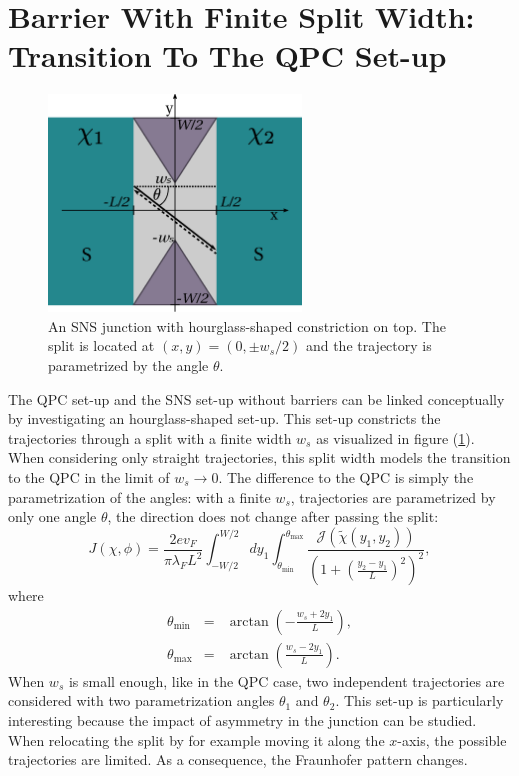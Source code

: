\section{Barrier With Finite Split Width: Transition To The QPC Set-up}
\begin{figure}
\centering
\includegraphics[width=0.6\textwidth]{figure/analyticalmodel/hourglass_csch}
\caption{An SNS junction with hourglass-shaped constriction on top. The split is located at $(x, y) = (0, \pm w_s / 2)$ and  the trajectory is parametrized by the angle $\theta$. }\label{fig:hourglass}
\end{figure}
The QPC set-up and the SNS set-up without barriers can be linked conceptually by investigating an hourglass-shaped set-up. This set-up constricts the trajectories through a split with a finite width $w_s$ as visualized in figure (\ref{fig:hourglass}). When considering only straight trajectories, this split width models the transition to the QPC in the limit of $w_s \rightarrow 0 $. The difference to the QPC is simply the parametrization of the angles: with a finite $w_s$, trajectories are parametrized by only one angle $\theta$, the direction does not change after passing the split:
\begin{equation}
J \left( \chi, \phi \right) = \frac{2 e v_F}{\pi \lambda_F L^2} \int_{-W/2}^{W/2} d y_1 \int_{\theta_\text{min}}^{\theta_\text{max}} \frac{\mathcal{J}(\tilde{\chi} ( y_1, y_2 ) )}{\left( 1 + \left(\frac{y_2 - y_1}{L}\right)^2 \right)^2},
\end{equation}
where
\begin{eqnarray}
\theta_\text{min} &=& \arctan\left( -\frac{w_s + 2y_1}{L} \right),\\
\theta_\text{max} &=& \arctan\left( \frac{w_s - 2y_1}{L} \right).
\end{eqnarray}
When $w_s$ is small enough, like in the QPC case, two independent trajectories are considered with two parametrization angles $\theta_1$ and $\theta_2$. 
This set-up is particularly interesting because the impact of asymmetry in the junction can be studied. When relocating the split by for example moving it along the $x$-axis, the possible trajectories are limited. As a consequence, the Fraunhofer pattern changes. 

